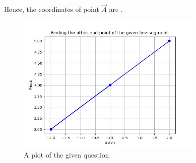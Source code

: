 \documentclass[journal]{IEEEtran}
\begin{document}
Hence, the coordinates of point $\vec{A}$ are  .

\begin{figure}[h] %
    \centering
    \includegraphics[width=0.8\textwidth]{figs/value1.jpg}
	\caption{A plot of the given question.}
    \label{fig:Plot1}
\end{figure}
 
\end{document}
